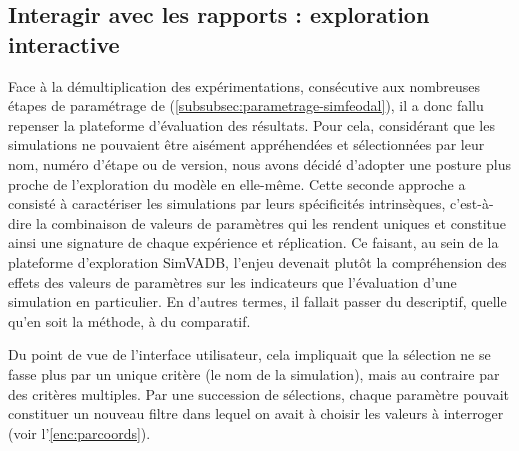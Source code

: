 \subsection{Interagir avec les rapports : exploration interactive}\label{subsec:explo-interactive}

Face à la démultiplication des expérimentations, consécutive aux nombreuses étapes de paramétrage de \simfeodal{} (\cref{subsubsec:parametrage-simfeodal}), il a donc fallu repenser la plateforme d'évaluation des résultats.
Pour cela, considérant que les simulations ne pouvaient être aisément appréhendées et sélectionnées par leur nom, numéro d'étape ou de version, nous avons décidé d'adopter une posture plus proche de l'exploration du modèle en elle-même.
Cette seconde approche a consisté à caractériser les simulations par leurs spécificités intrinsèques, c'est-à-dire la combinaison de valeurs de paramètres qui les rendent uniques et constitue ainsi une signature de chaque expérience et réplication.
Ce faisant, au sein de la plateforme d'exploration SimVADB, l'enjeu devenait plutôt la compréhension des effets des valeurs de paramètres sur les indicateurs que l'évaluation d'une simulation en particulier.
En d'autres termes, il fallait passer du descriptif, quelle qu'en soit la méthode, à du comparatif.

Du point de vue de l'interface utilisateur, cela impliquait que la sélection ne se fasse plus par un unique critère (le nom de la simulation), mais au contraire par des critères multiples.
Par une succession de sélections, chaque paramètre pouvait constituer un nouveau filtre dans lequel on avait à choisir les valeurs à interroger (voir l'\cref{enc:parcoords}).

